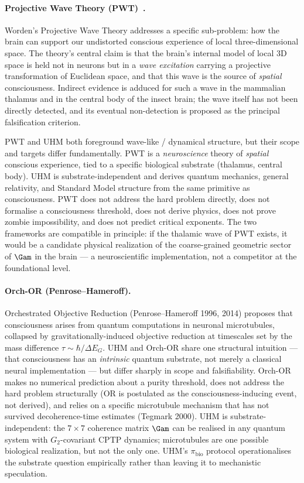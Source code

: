 \paragraph{Projective Wave Theory (PWT)~\cite{worden2026}.}
Worden's Projective Wave Theory addresses a specific sub-problem: how the
brain can support our undistorted conscious experience of local three-dimensional
space. The theory's central claim is that the brain's internal model of local
3D space is held not in neurons but in a \emph{wave excitation} carrying a
projective transformation of Euclidean space, and that this wave is the source
of \emph{spatial} consciousness. Indirect evidence is adduced for such a wave
in the mammalian thalamus and in the central body of the insect brain; the
wave itself has not been directly detected, and its eventual non-detection is
proposed as the principal falsification criterion.

PWT and UHM both foreground wave-like / dynamical structure, but their scope
and targets differ fundamentally. PWT is a \emph{neuroscience} theory of
\emph{spatial} conscious experience, tied to a specific biological substrate
(thalamus, central body). UHM is substrate-independent and derives quantum
mechanics, general relativity, and Standard Model structure from the same
primitive as consciousness. PWT does not address the hard problem directly,
does not formalise a consciousness threshold, does not derive physics, does
not prove zombie impossibility, and does not predict critical exponents. The
two frameworks are compatible in principle: if the thalamic wave of PWT
exists, it would be a candidate physical realization of the
coarse-grained geometric sector of $\Gam$ in the brain
--- a neuroscientific implementation, not a competitor at the foundational
level.

\paragraph{Orch-OR (Penrose--Hameroff).}
Orchestrated Objective Reduction (Penrose--Hameroff 1996, 2014) proposes
that consciousness arises from quantum computations in neuronal
microtubules, collapsed by gravitationally-induced objective reduction at
timescales set by the mass difference $\tau \sim \hbar/\Delta E_G$. UHM and
Orch-OR share one structural intuition --- that consciousness has an
\emph{intrinsic} quantum substrate, not merely a classical neural
implementation --- but differ sharply in scope and falsifiability. Orch-OR
makes no numerical prediction about a purity threshold, does not address
the hard problem structurally (OR is postulated as the
consciousness-inducing event, not derived), and relies on a specific
microtubule mechanism that has not survived decoherence-time estimates
(Tegmark 2000). UHM is substrate-independent: the $7 \times 7$ coherence
matrix $\Gam$ can be realised in any quantum system with $G_2$-covariant
CPTP dynamics; microtubules are one possible biological realization, but
not the only one. UHM's $\pi_{\mathrm{bio}}$ protocol operationalises the
substrate question empirically rather than leaving it to mechanistic
speculation.

